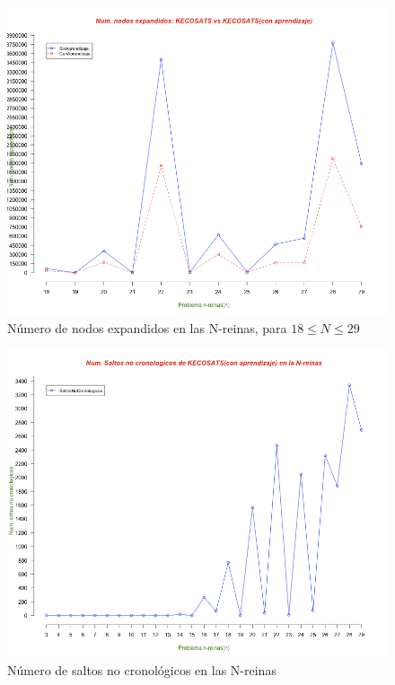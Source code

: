 \documentclass[12pt,lettersize,oneside]{article}
\begin{document}
\begin{figure}[!ht]\caption{Número de nodos expandidos en las N-reinas, para $18\leq
    N \leq 29$}
\label{NodosExpandidosReinasGrd}
\includegraphics[scale=0.62,angle=90]{figura3.png}
\end{figure}

\begin{figure}[!ht]\caption{Número de saltos no cronológicos en las N-reinas}
\label{SaltosNCReinas}
\includegraphics[scale=0.62,angle=90]{figura4.png}
\end{figure}

\newpage\newpage
\end{document}
